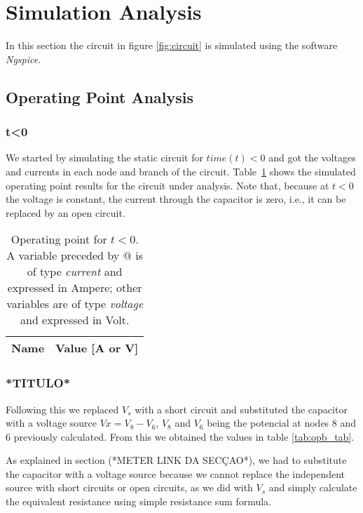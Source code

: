 \section{Simulation Analysis}
\label{sec:simulation}

In this section the circuit in figure \ref{fig:circuit} is simulated
using the software \textit{Ngspice}.

\subsection{Operating Point Analysis}

\subsubsection{t<0}


We started by simulating the static circuit for  $time (t) < 0$ and 
got the voltages and currents in each node and branch of the circuit.
Table~\ref{tab:op_tab} shows the simulated operating 
point results for the circuit under analysis.
Note that, because at $t<0$ the voltage is constant, the current through
the capacitor is zero, i.e., it can be replaced by an open circuit.

\hfill

\begin{table}[ht]
  \centering
  \begin{tabular}{|l|r|}
    \hline
    {\bf Name} & {\bf Value [A or V]} \\ \hline
    
  \end{tabular}
  \caption{Operating point for $t<0$. A variable preceded by @ is 
  of type {\em current} and expressed in Ampere; other variables 
  are of type {\it voltage} and expressed in Volt.}
  \label{tab:op_tab}
\end{table}

\subsubsection{*TITULO*}

Following this we replaced $V_s$ with a short circuit and substituted
the capacitor with a voltage source $Vx = V_8-V_6$, $V_8$ and $V_6$
being the potencial at nodes 8 and 6 previously calculated.
From this we obtained the values in table \ref{tab:opb_tab}. 

As explained in section (*METER LINK DA SECÇAO*), we had to substitute 
the capacitor with a voltage source because we cannot replace the 
independent source with short circuits or open circuits, as we did 
with $V_s$ and simply calculate the equivalent resistance using
simple resistance sum formula.

